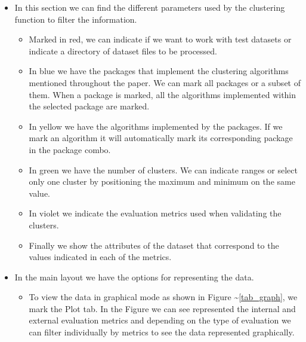 \documentclass[
]{article}
\providecommand{\tightlist}{%
  \setlength{\itemsep}{0pt}\setlength{\parskip}{0pt}}
\begin{document}
\begin{itemize}
\tightlist
\item
  In this section we can find the different parameters used by the
  clustering function to filter the information.

  \begin{itemize}
  \tightlist
  \item
    Marked in red, we can indicate if we want to work with test datasets
    or indicate a directory of dataset files to be processed.
  \item
    In blue we have the packages that implement the clustering
    algorithms mentioned throughout the paper. We can mark all packages
    or a subset of them. When a package is marked, all the algorithms
    implemented within the selected package are marked.
  \item
    In yellow we have the algorithms implemented by the packages. If we
    mark an algorithm it will automatically mark its corresponding
    package in the package combo.
  \item
    In green we have the number of clusters. We can indicate ranges or
    select only one cluster by positioning the maximum and minimum on
    the same value.
  \item
    In violet we indicate the evaluation metrics used when validating
    the clusters.
  \item
    Finally we show the attributes of the dataset that correspond to the
    values indicated in each of the metrics.
  \end{itemize}
\item
  In the main layout we have the options for representing the data.

  \begin{itemize}
  \tightlist
  \item
    To view the data in graphical mode as shown in Figure
    \textasciitilde{}\ref{tab_graph}, we mark the Plot tab. In the
    Figure we can see represented the internal and external evaluation
    metrics and depending on the type of evaluation we can filter
    individually by metrics to see the data represented graphically.
  \end{itemize}
\end{itemize}
\end{document}

